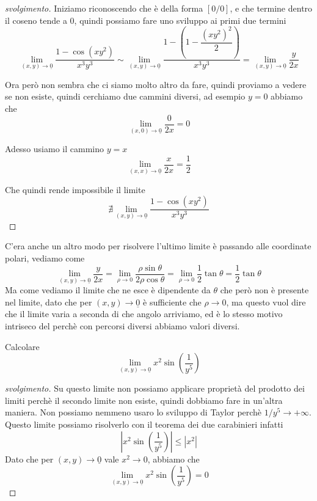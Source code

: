 \documentclass{rapport}
\begin{document}
\begin{proof}[svolgimento]
  Iniziamo riconoscendo che è della forma $[0/0]$, e che termine dentro il coseno tende a 0, quindi possiamo fare uno sviluppo ai primi due termini 
  \[
  \lim_{(x,y) \to \underline{0}} \dfrac{1-\cos(xy^2)}{x^3y^3} \sim \lim_{(x,y) \to \underline{0}} \dfrac{1-\left(1-\dfrac{(xy^2)^2}{2}\right)}{x^3y^3} =  \lim_{(x,y) \to \underline{0}} \dfrac{y}{2x}
  \]

  Ora però non sembra che ci siamo molto altro da fare, quindi proviamo a vedere se non esiste, quindi cerchiamo due cammini diversi, ad esempio $y=0$ abbiamo che 
   \[
  \lim_{(x,0) \to \underline{0}} \dfrac{0}{2x}  = 0
  \]

  Adesso usiamo il cammino $y=x$
   \[
  \lim_{(x,x) \to \underline{0}} \dfrac{x}{2x}  = \dfrac{1}{2}
  \]

  Che quindi rende impossibile il limite 
  \[
  \nexists \lim_{(x,y) \to \underline{0}} \dfrac{1-\cos(xy^2)}{x^3y^3}
  \]

\end{proof}

C'era anche un altro modo per risolvere l'ultimo limite è passando alle coordinate polari, vediamo come 
\[
\lim_{(x,y) \to \underline{0}} \dfrac{y}{2x} = \lim_{\rho \to 0} \dfrac{\rho \sin\theta}{2\rho \cos \theta} = \lim_{\rho \to 0} \dfrac{1}{2}\tan\theta =   \dfrac{1}{2}\tan\theta
\]
Ma come vediamo il limite che ne esce è dipendente da $\theta$ che però non è presente nel limite, dato che per $(x,y)\to \underline{0}$ è sufficiente che $\rho\to 0$, ma questo vuol dire che il limite varia a seconda di che angolo arriviamo, ed è lo stesso motivo intriseco del perchè con percorsi diversi abbiamo valori diversi.


\begin{esercizio}{}{}
Calcolare 
\[
\lim_{(x,y) \to \underline{0}} x^2\sin\left(\dfrac{1}{y^5}\right)
\]
\end{esercizio}

\begin{proof}[svolgimento]
  Su questo limite non possiamo applicare proprietà del prodotto dei limiti perchè il secondo limite non esiste, quindi dobbiamo fare in un'altra maniera. Non possiamo nemmeno usaro lo sviluppo di Taylor perchè $1/y^5\to +\infty$. Questo limite possiamo risolverlo con il teorema dei due carabinieri infatti 
  \[
  \left|x^2\sin\left(\dfrac{1}{y^5}\right)\right| \leq |x^2|
  \]
  Dato che per $(x,y)\to \underline{0}$ vale $x^2\to 0$, abbiamo che 
  \[
  \lim_{(x,y) \to \underline{0}} x^2\sin\left(\dfrac{1}{y^5}\right) = 0
  \]
\end{proof}
\end{document}
